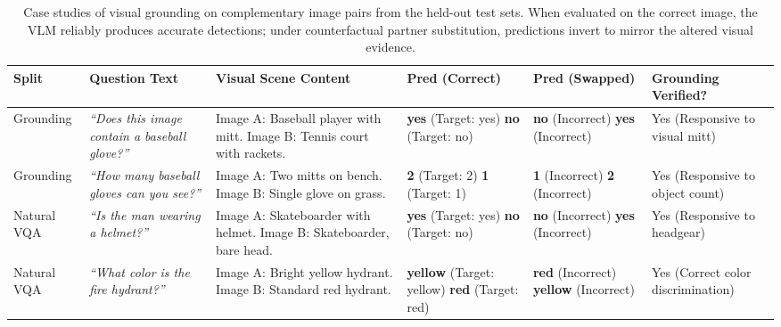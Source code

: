 \documentclass{article}
\begin{document}
\begin{table}[!htbp]
\centering
\caption{Case studies of visual grounding on complementary image pairs from the held-out test sets. When evaluated on the correct image, the VLM reliably produces accurate detections; under counterfactual partner substitution, predictions invert to mirror the altered visual evidence.}
\label{tab:vlm_case_studies}
\footnotesize
\setlength{\tabcolsep}{3.5pt}
\begin{tabularx}{\linewidth}{@{} l p{2.2cm} X p{1.6cm} p{1.6cm} p{2.1cm} @{}}
\toprule
\textbf{Split} & \textbf{Question Text} & \textbf{Visual Scene Content} & \textbf{Pred (Correct)} & \textbf{Pred (Swapped)} & \textbf{Grounding Verified?} \\
\midrule
Grounding & \textit{``Does this image contain a baseball glove?''} & Image A: Baseball player with mitt. \newline Image B: Tennis court with rackets. & \textbf{yes} (Target: yes) \newline \textbf{no} (Target: no) & \textbf{no} (Incorrect) \newline \textbf{yes} (Incorrect) & Yes (Responsive to visual mitt) \\
\midrule
Grounding & \textit{``How many baseball gloves can you see?''} & Image A: Two mitts on bench. \newline Image B: Single glove on grass. & \textbf{2} (Target: 2) \newline \textbf{1} (Target: 1) & \textbf{1} (Incorrect) \newline \textbf{2} (Incorrect) & Yes (Responsive to object count) \\
\midrule
Natural VQA & \textit{``Is the man wearing a helmet?''} & Image A: Skateboarder with helmet. \newline Image B: Skateboarder, bare head. & \textbf{yes} (Target: yes) \newline \textbf{no} (Target: no) & \textbf{no} (Incorrect) \newline \textbf{yes} (Incorrect) & Yes (Responsive to headgear) \\
\midrule
Natural VQA & \textit{``What color is the fire hydrant?''} & Image A: Bright yellow hydrant. \newline Image B: Standard red hydrant. & \textbf{yellow} (Target: yellow) \newline \textbf{red} (Target: red) & \textbf{red} (Incorrect) \newline \textbf{yellow} (Incorrect) & Yes (Correct color discrimination) \\
\bottomrule
\end{tabularx}
\end{table}
\end{document}
